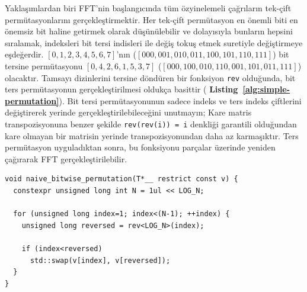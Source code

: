 \documentclass[10pt]{article}
\begin{document}
Yakla\c{s}{\i}mlardan biri FFT'nin ba\c{s}lang{\i}c{\i}nda t\"{u}m \"{o}zyinelemeli \c{c}a\u{g}r{\i}lar{\i}n tek-\c{c}ift 
perm\"{u}tasyonlar{\i}n{\i} ger\c{c}ekle\c{s}tirmektir. Her tek-\c{c}ift perm\"{u}tasyon en \"{o}nemli biti 
en \"{o}nemsiz bit haline getirmek olarak d\"{u}\c{s}\"{u}n\"{u}lebilir ve dolay{\i}s{\i}yla bunlar{\i}n 
hepsini s{\i}ralamak, indeksleri bit tersi indisleri ile de\u{g}i\c{s} toku\c{s} etmek suretiyle
de\u{g}i\c{s}tirmeye e\c{s}de\u{g}erdir. $[0, 1, 2, 3, 4, 5, 6, 7]$'n{\i}n 
($[000, 001, 010, 011, 100, 101, 110, 111]$) bit tersine perm\"{u}tasyonu 
$[0, 4, 2, 6, 1, 5, 3, 7]$ ($[000, 100, 010, 110, 001, 101, 011, 111]$) olacakt{\i}r.
Tamsay{\i} dizinlerini tersine d\"{o}nd\"{u}ren bir fonksiyon {\tt rev} oldu\u{g}unda,
bit ters perm\"{u}tasyonun ger\c{c}ekle\c{s}tirilmesi olduk\c{c}a basittir ({\bf 
Listing~\ref{alg:simple-permutation}}). Bit tersi perm\"{u}tasyonunun sadece indeks
ve ters indeks \c{c}iftlerini de\u{g}i\c{s}tirerek yerinde ger\c{c}ekle\c{s}tirilebilece\u{g}ini unutmay{\i}n; 
Kare matris transpozisyonuna benzer \c{s}ekilde {\tt rev(rev(i)) = i} denkli\u{g}i garantili
oldu\u{g}undan kare olmayan bir matrisin yerinde transpozisyonundan daha az karma\c{s}{\i}kt{\i}r.
Ters perm\"{u}tasyon uygulad{\i}ktan sonra, bu fonksiyonu par\c{c}alar \"{u}zerinde yeniden
\c{c}a\u{g}{\i}rarak FFT ger\c{c}ekle\c{s}tirilebilir.

\begin{footnotesize}
\begin{lstlisting}[label={alg:simple-permutation},caption={{\bf Bit tersine perm\"{u}tasyonun harici bir {\tt rev} 
fonksiyonu yard{\i}m{\i}yla ger\c{c}ekle\c{s}tirilmesi.} {\tt LOG\_N}, bir {\tt constexpr} olan
 problem boyutudur(derleme zaman{\i}nda bilinen bir sabit olarak da bilinir).{\tt rev} i\c{s}levinin
  tersine \c{c}evirme i\c{c}in kullan{\i}lan kelime boyutunu alacak \c{s}ekilde kal{\i}pland{\i}\u{g}{\i}n{\i} unutmay{\i}n.}]
void naive_bitwise_permutation(T*__ restrict const v) {
  constexpr unsigned long int N = 1ul << LOG_N;

  for (unsigned long index=1; index<(N-1); ++index) {
    unsigned long reversed = rev<LOG_N>(index);

    if (index<reversed)
      std::swap(v[index], v[reversed]);
  }
}
\end{lstlisting}
\end{footnotesize}
\end{document}
